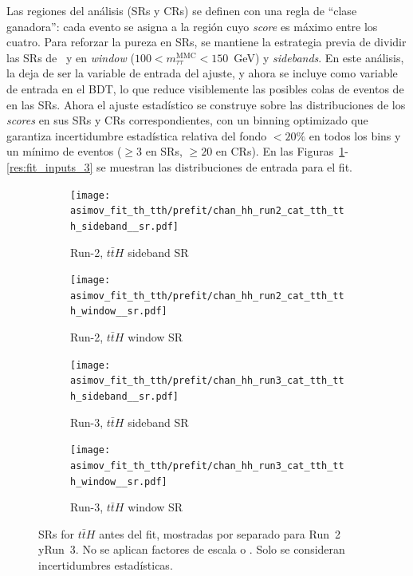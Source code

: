 Las regiones del análisis (SRs y CRs) se definen con una regla de “clase ganadora”: cada evento se asigna a la región cuyo \emph{score} es máximo entre los cuatro. Para reforzar la pureza en SRs, se mantiene la estrategia previa de dividir las SRs de \ttH\ y \thqb en \emph{window} ($100<m^{\text{MMC}}_{\tau\tau}<150$~GeV) y \emph{sidebands}. En este análisis, la \mmc deja de ser la variable de entrada del ajuste, y ahora se incluye como variable de entrada en el BDT, lo que reduce visiblemente las posibles colas de eventos de \ttbar en las SRs. 
Ahora el ajuste estadístico se construye sobre las distribuciones de los \emph{scores} en sus SRs y CRs correspondientes, con un binning optimizado que garantiza incertidumbre estadística relativa del fondo $<20\%$ en todos los bins y un mínimo de eventos ($\ge 3$ en SRs, $\ge 20$ en CRs). En las Figuras~\ref{res:fit_inputs_1}-\ref{res:fit_inputs_3} se muestran las distribuciones de entrada para el fit.

\begin{figure}[htbp]
  \centering
  \begin{subfigure}[t]{0.45\textwidth}
    \centering
    \texttt{[image: asimov\_fit\_th\_tth/prefit/chan\_hh\_run2\_cat\_tth\_tth\_sideband\_\_sr.pdf]}
    \caption{Run-2, $t\bar{t}H$ sideband SR}
  \end{subfigure}
  \hfill
  \begin{subfigure}[t]{0.45\textwidth}
    \centering
    \texttt{[image: asimov\_fit\_th\_tth/prefit/chan\_hh\_run2\_cat\_tth\_tth\_window\_\_sr.pdf]}
    \caption{Run-2, $t\bar{t}H$ window SR}
  \end{subfigure}

  \vspace{0.4cm}
  \begin{subfigure}[t]{0.45\textwidth}
    \centering
    \texttt{[image: asimov\_fit\_th\_tth/prefit/chan\_hh\_run3\_cat\_tth\_tth\_sideband\_\_sr.pdf]}
    \caption{Run-3, $t\bar{t}H$ sideband SR}
  \end{subfigure}
  \hfill
  \begin{subfigure}[t]{0.45\textwidth}
    \centering
    \texttt{[image: asimov\_fit\_th\_tth/prefit/chan\_hh\_run3\_cat\_tth\_tth\_window\_\_sr.pdf]}
    \caption{Run-3, $t\bar{t}H$ window SR}
  \end{subfigure}

  \caption{SRs for $t\bar{t}H$ antes del fit, mostradas por separado para Run~2 yRun~3. No se aplican factores de escala \ztautau o \ttbar. Solo se consideran incertidumbres estadísticas.}
  \label{res:fit_inputs_1}
\end{figure}


